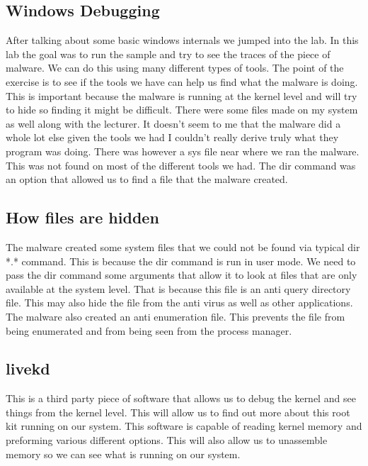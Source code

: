 \documentclass[letterpaper, onecolumn,10pt]{IEEEtran}
\begin{document}
		    \subsection{Windows Debugging}
		    After talking about some basic windows internals we jumped into the lab. In this lab the goal was to run the sample and try to see the traces of the piece of malware. We can do this using many different types of tools. The point of the exercise is to see if the tools we have can help us find what the malware is doing. This is important because the malware is running at the kernel level and will try to hide so finding it might be difficult. There were some files made on my system as well along with the lecturer. It doesn't seem to me that the malware did a whole lot else given the tools we had I couldn't really derive truly what they program was doing. There was however a sys file near where we ran the malware. This was not found on most of the different tools we had. The dir command was an option that allowed us to find a file that the malware created.\\
		    
		    \subsection{How files are hidden}
		    The malware created some system files that we could not be found via typical dir *.* command. This is because the dir command is run in user mode. We need to pass the dir command some arguments that allow it to look at files that are only available at the system level. That is because this file is an anti query directory file. This may also hide the file from the anti virus as well as other applications. The malware also created an anti enumeration file. This prevents the file from being enumerated and from being seen from the process manager.\\
		    
		    \subsection{livekd}
		    This is a third party piece of software that allows us to debug the kernel and see things from the kernel level. This will allow us to find out more about this root kit running on our system. This software is capable of reading kernel memory and preforming various different options. This will also allow us to unassemble memory so we can see what is running on our system.\\
		    
\end{document}
